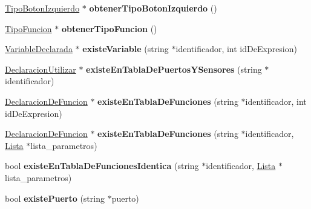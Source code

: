 \begin{DoxyCompactItemize}
\item 
\hypertarget{class_programa_ada66ce18cafd9c74ee36056f403ea3bc}{\hyperlink{class_tipo_boton_izquierdo}{Tipo\-Boton\-Izquierdo} $\ast$ {\bfseries obtener\-Tipo\-Boton\-Izquierdo} ()}\label{class_programa_ada66ce18cafd9c74ee36056f403ea3bc}

\item 
\hypertarget{class_programa_ab62851a817e2508bb08fad2939232d68}{\hyperlink{class_tipo_funcion}{Tipo\-Funcion} $\ast$ {\bfseries obtener\-Tipo\-Funcion} ()}\label{class_programa_ab62851a817e2508bb08fad2939232d68}

\item 
\hypertarget{class_programa_a24a7ee46bbba1ca0c272601f4c8b44af}{\hyperlink{class_variable_declarada}{Variable\-Declarada} $\ast$ {\bfseries existe\-Variable} (string $\ast$identificador, int id\-De\-Expresion)}\label{class_programa_a24a7ee46bbba1ca0c272601f4c8b44af}

\item 
\hypertarget{class_programa_a76c2bbf5456195da7567faa948170ead}{\hyperlink{class_declaracion_utilizar}{Declaracion\-Utilizar} $\ast$ {\bfseries existe\-En\-Tabla\-De\-Puertos\-Y\-Sensores} (string $\ast$identificador)}\label{class_programa_a76c2bbf5456195da7567faa948170ead}

\item 
\hypertarget{class_programa_aa99dd983d4209f1855a8a22476316143}{\hyperlink{class_declaracion_de_funcion}{Declaracion\-De\-Funcion} $\ast$ {\bfseries existe\-En\-Tabla\-De\-Funciones} (string $\ast$identificador, int id\-De\-Expresion)}\label{class_programa_aa99dd983d4209f1855a8a22476316143}

\item 
\hypertarget{class_programa_a37b0386a1d95a4406d2cb013628feefb}{\hyperlink{class_declaracion_de_funcion}{Declaracion\-De\-Funcion} $\ast$ {\bfseries existe\-En\-Tabla\-De\-Funciones} (string $\ast$identificador, \hyperlink{class_lista}{Lista} $\ast$lista\-\_\-parametros)}\label{class_programa_a37b0386a1d95a4406d2cb013628feefb}

\item 
\hypertarget{class_programa_a3463be0041f86dd634a24054231fcf20}{bool {\bfseries existe\-En\-Tabla\-De\-Funciones\-Identica} (string $\ast$identificador, \hyperlink{class_lista}{Lista} $\ast$lista\-\_\-parametros)}\label{class_programa_a3463be0041f86dd634a24054231fcf20}

\item 
\hypertarget{class_programa_a535930e96f243566cec514ea96298fe4}{bool {\bfseries existe\-Puerto} (string $\ast$puerto)}\label{class_programa_a535930e96f243566cec514ea96298fe4}


\end{DoxyCompactItemize}
